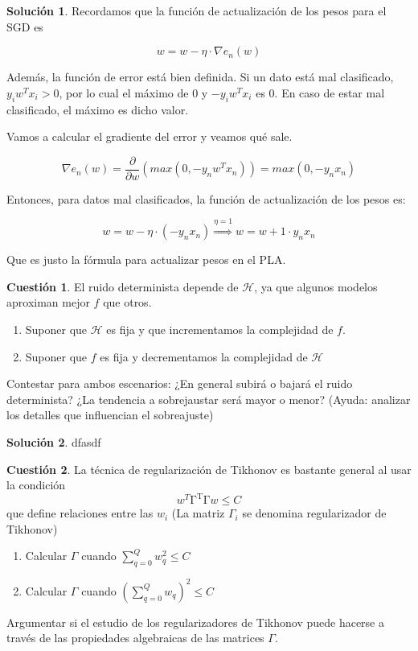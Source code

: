 \documentclass[a4paper, 11pt]{article}
\theoremstyle{definition}
\newtheorem{cuestion}{Cuestión}
\newtheorem*{solucion}{Solución}
\begin{document}
  \begin{solucion}
    Recordamos que la función de actualización de los pesos para el SGD es

    $$ w = w - \eta \cdot \nabla e_n(w) $$

    Además, la función de error está bien definida. Si un dato está mal clasificado, $y_iw^Tx_i > 0$, por lo cual el máximo de 0 y $-y_iw^Tx_i$ es 0. En caso de estar mal clasificado, el máximo es dicho valor.

    Vamos a calcular el gradiente del error y veamos qué sale.

    $$ \nabla e_n(w) = \frac{\partial}{\partial w} \left( max(0, -y_nw^Tx_n) \right) = max(0, -y_nx_n) $$

    Entonces, para datos mal clasificados, la función de actualización de los pesos es:

    $$ w = w - \eta \cdot (-y_nx_n) \overset{\eta=1}{\Rightarrow} w = w + 1 \cdot y_nx_n $$

    Que es justo la fórmula para actualizar pesos en el PLA.
  \end{solucion}

  \begin{cuestion}
    El ruido determinista depende de $\mathcal{H}$, ya que algunos modelos aproximan mejor $f$ que otros.
    \begin{enumerate}
        \item Suponer que $\mathcal{H}$ es fija y que incrementamos la complejidad de $f$.
        \item Suponer que $ f$ es fija y decrementamos la complejidad de $\mathcal{H}$
    \end{enumerate}
    Contestar para ambos escenarios: ¿En general subirá o bajará el ruido determinista? ¿La tendencia a sobrejaustar será mayor o menor? (Ayuda: analizar los detalles que influencian el sobreajuste)
  \end{cuestion}

  \begin{solucion}
    dfasdf
  \end{solucion}


  \begin{cuestion}
    La técnica de regularización de Tikhonov es bastante general al usar la condición
    \[
    w^T\mathrm{\Gamma^T\Gamma}w\leq C
    \]
    que define relaciones entre las $w_i$ (La matriz $\Gamma_i$ se denomina regularizador de Tikhonov)
    \begin{enumerate}
    \item Calcular $\Gamma$ cuando $\sum_{q=0}^Q w_q^2 \leq C$
    \item Calcular $\Gamma$ cuando $(\sum_{q=0}^Q w_q)^2 \leq C$
    \end{enumerate}
    Argumentar si el estudio de los regularizadores de Tikhonov puede hacerse a través de las propiedades algebraicas de las matrices $\Gamma$.
  \end{cuestion}
\end{document}
